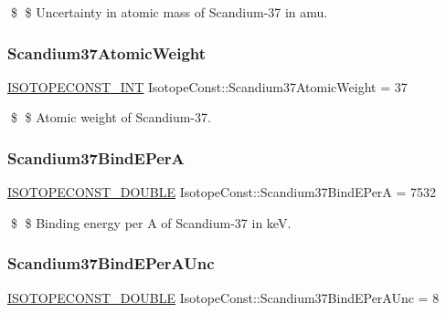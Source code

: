\$ \$ Uncertainty in atomic mass of Scandium-\/37 in amu. \mbox{\label{group___isotope_const-_scandium-_sc37_gaee4bbc6b58fa600ece463fe630b78a34}} 
\subsubsection{\texorpdfstring{Scandium37\+Atomic\+Weight}{Scandium37AtomicWeight}}
{\footnotesize\ttfamily \mbox{\hyperlink{group___isotope_const-_macros_ga5f18360b3e99483a35c32d789e62621c}{I\+S\+O\+T\+O\+P\+E\+C\+O\+N\+S\+T\+\_\+\+I\+NT}} Isotope\+Const\+::\+Scandium37\+Atomic\+Weight = 37}

\$ \$ Atomic weight of Scandium-\/37. \mbox{\label{group___isotope_const-_scandium-_sc37_ga2c5c1fa26c39ecf9916c7309d2831a75}} 
\subsubsection{\texorpdfstring{Scandium37\+Bind\+E\+PerA}{Scandium37BindEPerA}}
{\footnotesize\ttfamily \mbox{\hyperlink{group___isotope_const-_macros_ga8f45a7272ce02c0b4c65c44636ed719a}{I\+S\+O\+T\+O\+P\+E\+C\+O\+N\+S\+T\+\_\+\+D\+O\+U\+B\+LE}} Isotope\+Const\+::\+Scandium37\+Bind\+E\+PerA = 7532}

\$ \$ Binding energy per A of Scandium-\/37 in keV. \mbox{\label{group___isotope_const-_scandium-_sc37_gace2f91c58e045672bfd893ffe65cf40e}} 
\subsubsection{\texorpdfstring{Scandium37\+Bind\+E\+Per\+A\+Unc}{Scandium37BindEPerAUnc}}
{\footnotesize\ttfamily \mbox{\hyperlink{group___isotope_const-_macros_ga8f45a7272ce02c0b4c65c44636ed719a}{I\+S\+O\+T\+O\+P\+E\+C\+O\+N\+S\+T\+\_\+\+D\+O\+U\+B\+LE}} Isotope\+Const\+::\+Scandium37\+Bind\+E\+Per\+A\+Unc = 8}

